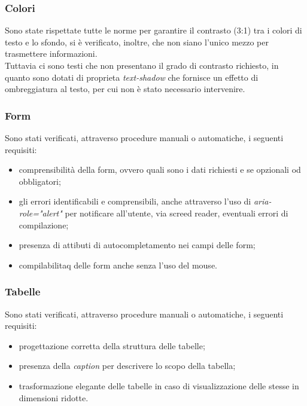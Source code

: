 \subsubsection{Colori}
\label{subsubsec:accessibility-colors}
Sono state rispettate tutte le norme per garantire il contrasto (3:1) tra i colori di testo e lo sfondo, si è verificato, inoltre, che non siano l'unico mezzo per trasmettere informazioni. \\
Tuttavia ci sono testi che non presentano il grado di contrasto richiesto, in quanto sono dotati di proprieta \textit{text-shadow} che fornisce un effetto di ombreggiatura al testo, per cui non è stato necessario intervenire.

\subsubsection{Form}
\label{subsubsec:accessibility-forms}
Sono stati verificati, attraverso procedure manuali o automatiche, i seguenti requisiti:
\begin{itemize}
    \item comprensibilità della form, ovvero quali sono i dati richiesti e se opzionali od obbligatori;
    \item gli errori identificabili e comprensibili, anche attraverso l'uso di \textit{aria-role="alert"} per notificare all'utente, via screed reader, eventuali errori di compilazione;
    \item presenza di attibuti di autocompletamento nei campi delle form;
    \item compilabilitaq delle form anche senza l'uso del mouse.
\end{itemize}

\subsubsection{Tabelle}
\label{subsubsec:accessibility-tables}
Sono stati verificati, attraverso procedure manuali o automatiche, i seguenti requisiti:
\begin{itemize}
    \item progettazione corretta della struttura delle tabelle;
    \item presenza della \textit{caption} per descrivere lo scopo della tabella;
    \item trasformazione elegante delle tabelle in caso di visualizzazione delle stesse in dimensioni ridotte.
\end{itemize}


